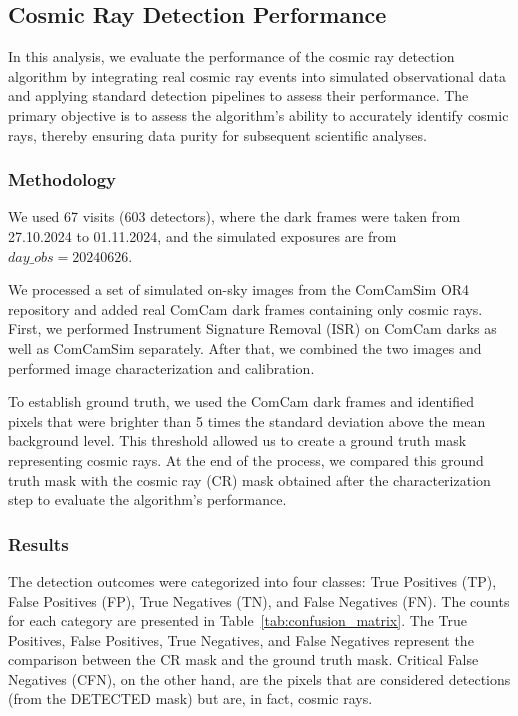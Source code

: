 \subsection{Cosmic Ray Detection Performance}

In this analysis, we evaluate the performance of the cosmic ray detection algorithm by integrating real cosmic ray events into simulated observational data and applying standard detection pipelines to assess their performance. The primary objective is to assess the algorithm's ability to accurately identify cosmic rays, thereby ensuring data purity for subsequent scientific analyses.

\subsubsection{Methodology}

We used 67 visits (603 detectors), where the dark frames were taken from 27.10.2024 to 01.11.2024, and the simulated exposures are from $day\_obs=20240626$.

We processed a set of simulated on-sky images from the ComCamSim OR4 repository and added real ComCam dark frames containing only cosmic rays. First, we performed Instrument Signature Removal (ISR) on ComCam darks as well as ComCamSim separately. After that, we combined the two images and performed image characterization and calibration.

To establish ground truth, we used the ComCam dark frames and identified pixels that were brighter than 5 times the standard deviation above the mean background level. This threshold allowed us to create a ground truth mask representing cosmic rays. At the end of the process, we compared this ground truth mask with the cosmic ray (CR) mask obtained after the characterization step to evaluate the algorithm's performance.

\subsubsection{Results}

The detection outcomes were categorized into four classes: True Positives (TP), False Positives (FP), True Negatives (TN), and False Negatives (FN). The counts for each category are presented in Table~\ref{tab:confusion_matrix}. The True Positives, False Positives, True Negatives, and False Negatives represent the comparison between the CR mask and the ground truth mask. Critical False Negatives (CFN), on the other hand, are the pixels that are considered detections (from the DETECTED mask) but are, in fact, cosmic rays.

